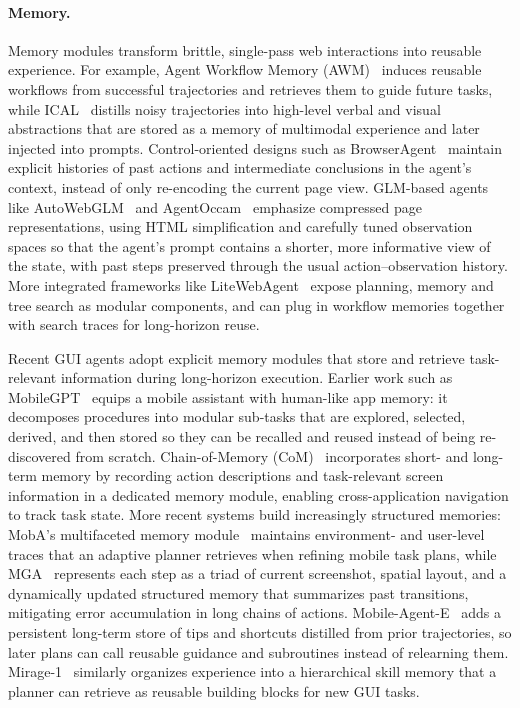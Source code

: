 \paragraph{Memory.}


Memory modules transform brittle, single-pass web interactions into reusable experience. For example, Agent Workflow Memory (AWM)~\cite{Wang2024AgentWM} induces reusable workflows from successful trajectories and retrieves them to guide future tasks, while ICAL~\cite{sarch2024vlm} distills noisy trajectories into high-level verbal and visual abstractions that are stored as a memory of multimodal experience and later injected into prompts. Control-oriented designs such as BrowserAgent~\cite{zhang2025browseragent} maintain explicit histories of past actions and intermediate conclusions in the agent’s context, instead of only re-encoding the current page view. GLM-based agents like AutoWebGLM~\cite{lai2024autowebglm} and AgentOccam~\cite{yang2024agentoccam} emphasize compressed page representations, using HTML simplification and carefully tuned observation spaces so that the agent’s prompt contains a shorter, more informative view of the state, with past steps preserved through the usual action–observation history. More integrated frameworks like LiteWebAgent~\cite{zhang2025litewebagent} expose planning, memory and tree search as modular components, and can plug in workflow memories together with search traces for long-horizon reuse.



Recent GUI agents adopt explicit memory modules that store and retrieve task-relevant information during long-horizon execution. Earlier work such as MobileGPT~\cite{lee2024mobilegpt} equips a mobile assistant with human-like app memory: it decomposes procedures into modular sub-tasks that are explored, selected, derived, and then stored so they can be recalled and reused instead of being re-discovered from scratch. Chain-of-Memory (CoM)~\cite{gao2025chain} incorporates short- and long-term memory by recording action descriptions and task-relevant screen information in a dedicated memory module, enabling cross-application navigation to track task state. More recent systems build increasingly structured memories: MobA’s multifaceted memory module~\cite{zhu2025moba} maintains environment- and user-level traces that an adaptive planner retrieves when refining mobile task plans, while MGA~\cite{cheng2025mga} represents each step as a triad of current screenshot, spatial layout, and a dynamically updated structured memory that summarizes past transitions, mitigating error accumulation in long chains of actions. Mobile-Agent-E~\cite{wang2025mobileagente} adds a persistent long-term store of tips and shortcuts distilled from prior trajectories, so later plans can call reusable guidance and subroutines instead of relearning them. Mirage-1~\cite{xie2025mirage} similarly organizes experience into a hierarchical skill memory that a planner can retrieve as reusable building blocks for new GUI tasks. 




